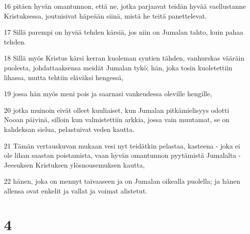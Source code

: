 \par 16 pitäen hyvän omantunnon, että ne, jotka parjaavat teidän hyvää vaellustanne Kristuksessa, joutuisivat häpeään siinä, mistä he teitä panettelevat.
\par 17 Sillä parempi on hyvää tehden kärsiä, jos niin on Jumalan tahto, kuin pahaa tehden.
\par 18 Sillä myös Kristus kärsi kerran kuoleman syntien tähden, vanhurskas vääräin puolesta, johdattaaksensa meidät Jumalan tykö; hän, joka tosin kuoletettiin lihassa, mutta tehtiin eläväksi hengessä,
\par 19 jossa hän myös meni pois ja saarnasi vankeudessa oleville hengille,
\par 20 jotka muinoin eivät olleet kuuliaiset, kun Jumalan pitkämielisyys odotti Nooan päivinä, silloin kun valmistettiin arkkia, jossa vain muutamat, se on kahdeksan sielua, pelastuivat veden kautta.
\par 21 Tämän vertauskuvan mukaan vesi nyt teidätkin pelastaa, kasteena - joka ei ole lihan saastan poistamista, vaan hyvän omantunnon pyytämistä Jumalalta - Jeesuksen Kristuksen ylösnousemuksen kautta,
\par 22 hänen, joka on mennyt taivaaseen ja on Jumalan oikealla puolella; ja hänen allensa ovat enkelit ja vallat ja voimat alistetut.

\chapter{4}

